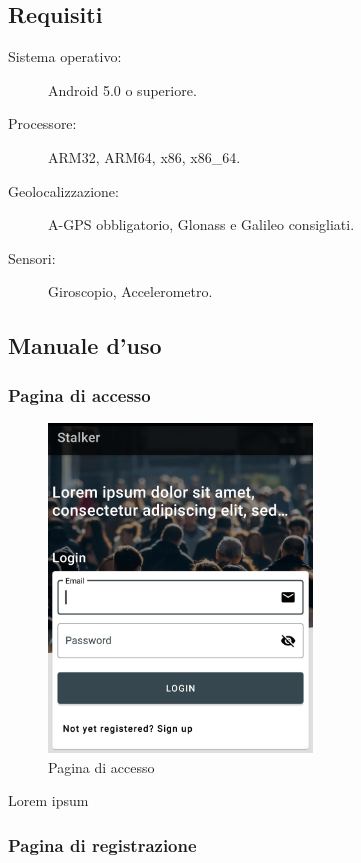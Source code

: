 \documentclass[../manuale-utente.tex]{subfiles}
\begin{document}
\subsection{Requisiti}%
\label{sub:requisiti}

\begin{description}
    \item[Sistema operativo:] Android 5.0 o superiore.
    \item[Processore:] ARM32, ARM64, x86, x86\_64.
    \item[Geolocalizzazione:] A-GPS obbligatorio, Glonass e Galileo consigliati.
    \item[Sensori:] Giroscopio, Accelerometro.
\end{description}


\subsection{Manuale d'uso}%
\label{sub:manuale-uso-mobile}

\subsubsection{Pagina di accesso}%
\label{sub:pagina-di-accesso}

\begin{figure}[H]
    \centering
    \includegraphics[width=70mm]{img/mobile-app/pagina-di-accesso.jpg}
    \caption{Pagina di accesso}%
    \label{fig:mobile-app-pagina-di-accesso}
\end{figure}

Lorem ipsum

\subsubsection{Pagina di registrazione}%
\label{sub:pagina-di-registrazione}
\end{document}
